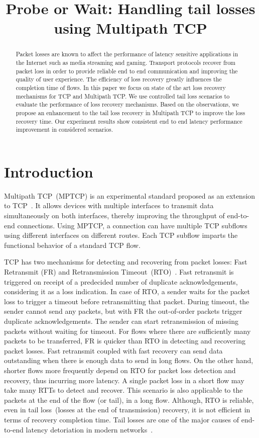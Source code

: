 \documentclass[10pt,conference]{IEEEtran}
\title{Probe or Wait: Handling tail losses using Multipath TCP}
\author{\IEEEauthorblockN{Kiran~Yedugundla, Per~Hurtig, Anna~Brunstrom}
\IEEEauthorblockA{Dept. of Computer Science, Karlstad University, Karlstad, Sweden}}
\begin{document}
\maketitle

\begin{abstract}
Packet losses are known to affect the performance of latency sensitive applications in the Internet such as media streaming and gaming. Transport protocols recover from packet loss in order to provide reliable end to end communication and improving the quality of user experience. The efficiency of loss recovery greatly influences the completion time of flows. In this paper we focus on state of the art loss recovery mechanisms for TCP and Multipath TCP. We use controlled tail loss scenarios to evaluate the performance of loss recovery mechanisms. Based on the observations, we propose an enhancement to the tail loss recovery in Multipath TCP to improve the loss recovery time. Our experiment results show consistent end to end latency performance improvement in considered scenarios. 
\end{abstract}

\section{Introduction}


Multipath TCP~(MPTCP) is an experimental standard proposed as an extension to TCP~\cite{rfc6824}. It allows devices with multiple interfaces to transmit data simultaneously on both interfaces, thereby improving the throughput of end-to-end connections. Using MPTCP, a connection can have multiple TCP subflows using different interfaces on different routes. Each TCP subflow imparts the functional behavior of a standard TCP flow. 

TCP has two mechanisms for detecting and recovering from packet losses: Fast Retransmit (FR) and Retransmission Timeout~(RTO)~\cite{Flach:2013}. Fast retransmit is triggered on receipt of a predecided number of duplicate acknowledgements, considering it as a loss indication. In case of RTO, a sender waits for the packet loss to trigger a timeout before retransmitting that packet. During timeout, the sender cannot send any packets, but with FR the out-of-order packets trigger duplicate acknowledgements. The sender can start retransmission of missing packets without waiting for timeout. For flows where there are sufficiently many packets to be transferred, FR is quicker than RTO in detecting and recovering packet losses. Fast retransmit coupled with fast recovery can send data outstanding when there is enough data to send in long flows. On the other hand, shorter flows more frequently depend on RTO for packet loss detection and recovery, thus incurring more latency. A single packet loss in a short flow may take many RTTs to detect and recover. This scenario is also applicable to the packets at the end of the flow (or tail), in a long flow. Although, RTO is reliable, even in tail loss~(losses at the end of transmission) recovery, it is not efficient in terms of recovery completion time. Tail losses are one of the major causes of end-to-end latency detoriation in modern networks~\cite{Flach:2013}. 
\end{document}
